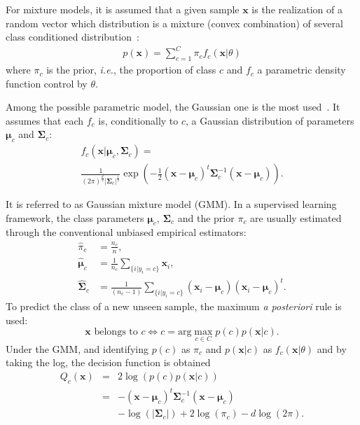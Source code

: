 \documentclass[journal,10pt]{IEEEtran}
\begin{document}
    For mixture models, it is assumed  that a given sample $\mathbf{x}$ is
    the realization  of a  random vector which  distribution is  a mixture
    (convex     combination)     of      several     class     conditioned
    distribution~\cite{Fraley00model-basedclustering}:
    \begin{align}
        p(\mathbf{x}) = \sum_{c=1}^{C} \pi_c f_c(\mathbf{x}|\theta)
    \end{align}
    where $\pi_c$ is  the prior, \emph{i.e.}, the  proportion of class
    $c$  and  $f_c$  a  parametric density  function  control by
    $\theta$.

    Among the possible parametric model,  the Gaussian one is the most
    used~\cite{bouveyron2014model}.   It assumes  that each  $f_c$ is,
    conditionally  to  $c$,  a  Gaussian  distribution  of  parameters
    $\boldsymbol{\mu}_c$    and    $\boldsymbol{\Sigma}_c$:
    \begin{multline}
        f_c(\mathbf{x}|\boldsymbol{\mu}_c, \boldsymbol{\Sigma}_c) = \\ \frac{1}{(2\pi)^{\frac{d}{2}} |\boldsymbol{\Sigma}_c|^{\frac{1}{2}}} \exp \left( -\frac{1}{2} (\mathbf{x} - \boldsymbol{\mu}_c)^t \boldsymbol{\Sigma}_c^{-1} (\mathbf{x} - \boldsymbol{\mu}_c) \right).
    \end{multline}

    It  is  referred  to  as  Gaussian  mixture  model  (GMM).   In  a
    supervised    learning    framework,    the    class    parameters
    $\boldsymbol{\mu}_c$,   $\boldsymbol{\Sigma}_c$   and  the   prior
    $\pi_c$ are  usually estimated  through the  conventional unbiased
    empirical estimators:
    \begin{align}
        \hat{\pi}_c &= \frac{n_c}{n},\\
        \hat{\boldsymbol{\mu}}_c &= \frac{1}{n_c} \sum_{\{i|y_i = c\}} \mathbf{x}_i ,\\
        \hat{\boldsymbol{\Sigma}}_c &= \frac{1}{(n_c - 1)} \sum_{\{i|y_i = c\}} (\mathbf{x}_i - \boldsymbol{\mu}_c) (\mathbf{x}_i - \boldsymbol{\mu}_c)^t.
    \end{align}
    To predict the  class of a new unseen sample,  the maximum \emph{a
      posteriori}  rule  is  used:
    \begin{equation*}
        \mathbf{x} \text{ belongs to } c \Leftrightarrow c = \text{arg} \max_{c \in C} p(c) p(\mathbf{x}|c).
    \end{equation*}
    Under the GMM,  and identifying $p(c)$ as $\pi_c$  and $p(\mathbf{x}|c)$ as
    $f_c(\mathbf{x}|\theta)$ and by taking the log, the decision function is obtained
    \begin{eqnarray}\label{eq:decision}
      Q_c(\mathbf{x}) &=& 2 \log \left( p(c) p(\mathbf{x}|c) \right) \nonumber \\
                      &=& - (\mathbf{x} - \boldsymbol{\mu}_c)^t \boldsymbol{\Sigma}_c^{-1} (\mathbf{x} - \boldsymbol{\mu}_c) \nonumber \\
                      & &-\log (|\boldsymbol{\Sigma}_c|) + 2 \log (\pi_c) - d \log (2\pi).
    \end{eqnarray}
\end{document}
